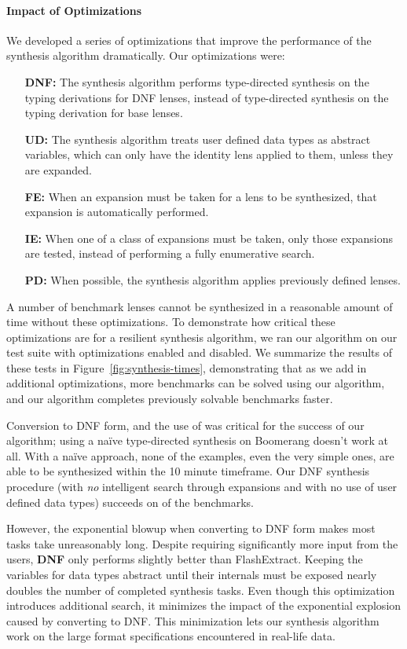 \documentclass[acmsmall]{acmart}
\begin{document}
\paragraph*{Impact of Optimizations}
We developed a series of optimizations that improve the performance of the
synthesis algorithm dramatically.
Our optimizations were:
\begin{itemize}
\item[\textbf{DNF:}]  The synthesis algorithm performs type-directed synthesis
  on the typing derivations for DNF lenses, instead of type-directed synthesis on the typing
  derivation for base lenses.
\item[\textbf{UD:}]  The synthesis algorithm treats user defined data types as
  abstract variables, which can only have the identity lens applied to them,
  unless they are expanded.
\item[\textbf{FE:}] When an expansion must be taken for a lens to be
  synthesized, that expansion is automatically performed.
\item[\textbf{IE:}] When one of a class of expansions must be taken, only those
  expansions are tested, instead of performing a fully enumerative search.
\item[\textbf{PD:}] When possible, the synthesis algorithm applies
  previously defined lenses.
\end{itemize}

A number of benchmark lenses cannot
be synthesized in a reasonable amount of time without these optimizations.
To demonstrate how critical these optimizations
are for a resilient synthesis algorithm, we ran our algorithm on our test suite
with optimizations enabled and disabled.
We summarize the results of these tests in Figure~\ref{fig:synthesis-times},
demonstrating that as we add in additional optimizations, more benchmarks can be
solved using our algorithm, and our algorithm completes previously solvable
benchmarks faster.

Conversion to DNF form, and the use of \RigidSynth{} was critical for the
success of our algorithm; using
a na\"{i}ve type-directed synthesis on Boomerang doesn't work at all.  With a
na\"{i}ve approach, none of the examples, even the very simple ones, are able to
be synthesized within the 10 minute timeframe.  Our DNF synthesis procedure
(with \emph{no} intelligent search through expansions and with no use of user
defined data types) succeeds on  of the benchmarks.

However, the exponential blowup when converting to DNF form makes most tasks
take unreasonably long.
Despite requiring significantly more input from the users, \textbf{DNF} only
performs slightly better than FlashExtract.
Keeping the variables for data
types abstract until their internals must be exposed nearly doubles the number
of completed synthesis tasks.
Even though this optimization introduces additional search, it minimizes the
impact of the exponential explosion caused by converting to DNF.
This minimization lets our synthesis algorithm work on the
large format specifications encountered in real-life data.
\end{document}
